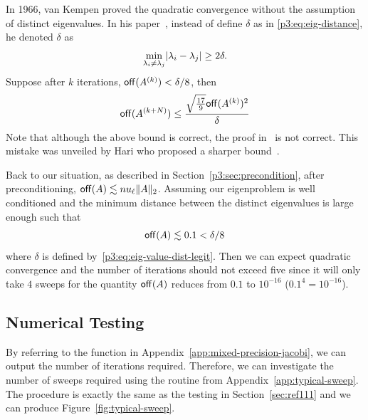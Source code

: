 In 1966, van Kempen proved the quadratic convergence without the assumption of distinct eigenvalues. In his paper~, instead of define $\delta$ as in \eqref{p3:eq:eig-distance}, he denoted $\delta$ as 
\begin{equation}
  \label{p3:eq:eig-value-dist-legit}
  \min_{\lambda_i \neq \lambda_j} \lvert\lambda_i - \lambda_j\rvert \geq 2\delta.
\end{equation}
Suppose after $k$ iterations, $\mathsf{off}(A^{(k)}) < \delta/8$, then 
\begin{equation}\notag
  \mathsf{off}(A^{(k+N)}) \leq \frac{\sqrt{\frac{17}{9}}\mathsf{off}(A^{(k)})^2}{\delta}
\end{equation}
Note that although the above bound is correct, the proof in~ is not correct. This mistake was unveiled by Hari who proposed a sharper bound~.

Back to our situation, as described in Section~\ref{p3:sec:precondition}, after preconditioning, $\mathsf{off}(A) \lesssim nu_\ell \|{A}\|_2$. Assuming our eigenproblem is well conditioned and the minimum distance between the distinct eigenvalues is large enough such that 
$$\mathsf{off}(A) \lesssim 0.1 < \delta / 8$$
where $\delta$ is defined by~\eqref{p3:eq:eig-value-dist-legit}. Then we can expect quadratic convergence and the number of iterations should not exceed five since it will only take $4$ sweeps for the quantity $\mathsf{off}(A)$ reduces from $0.1$ to $10^{-16}$ ($0.1^4 = 10^{-16}$).

\subsection{Numerical Testing}
By referring to the function  in Appendix~\ref{app:mixed-precision-jacobi}, we can output the number of iterations required. Therefore, we can investigate the number of sweeps required using the routine from Appendix~\ref{app:typical-sweep}. The procedure is exactly the same as the testing in Section~\ref{sec:ref111} and we can produce Figure~\ref{fig:typical-sweep}.

